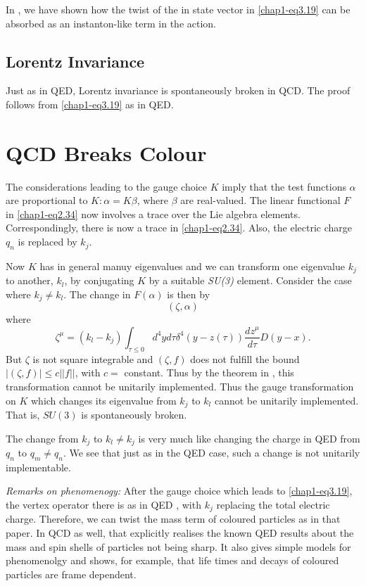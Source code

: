 In \cite{key4}, we have shown how the twist of the in state vector in \eqref{chap1-eq3.19} can be absorbed as an instanton-like term in the action.

\subsection{Lorentz Invariance}\label{chap1-sec3.2}

Just as in QED, Lorentz invariance is spontaneously broken in QCD. The proof follows from \eqref{chap1-eq3.19} as in QED.

\section{QCD Breaks Colour}\label{chap1-sec4}

The considerations leading to the gauge choice $K$ imply that the test functions $\alpha$ are proportional to $K: \alpha = K \beta$, where $\beta$ are real-valued. The linear functional $F$ in \eqref{chap1-eq2.34} now involves a trace over the Lie algebra elements. Correspondingly, there is now a trace in \eqref{chap1-eq2.34}. Also, the electric charge $q_n$ is replaced by $k_j$.

Now $K$ has in general manuy eigenvalues and we can transform one eigenvalue $k_j$ to another, $k_l$, by conjugating $K$ by a suitable \textit{SU(3)} element. Consider the case where $k_j \neq k_l$. The change in $F(\alpha)$ is then by
\begin{equation}
(\zeta, \alpha) \label{chap1-eq4.1}
\end{equation}
where
\begin{equation}
  \zeta^\mu = (k_l - k_j) \int_{\tau \leq 0} d^4 y d\tau \delta^4 (y -z(\tau)) \frac{dz^\mu}{d \tau} D (y-x). \label{chap1-eq4.2}
\end{equation}
But $\zeta$ is not square integrable and $(\zeta, f)$ does not fulfill the bound $|(\zeta, f)|\leq c || f ||$, with $c=$ constant. Thus by the theorem in \cite{key6}, this transformation cannot be unitarily implemented. Thus the gauge transformation on $K$ which changes its eigenvalue from $k_j$ to $k_l$ cannot be unitarily implemented. That is, $SU(3)$ is spontaneously broken.

The change from $k_j$ to $k_l \neq k_j$ is very much like changing the charge in QED from $q_n$ to $q_m \neq q_n$. We see that just as in the QED case, such a change is not unitarily implementable.

\textit{Remarks on phenomenogy:} After the gauge choice which leads to \eqref{chap1-eq3.19}, the vertex operator there is as in QED \cite{key4}, with $k_j$ replacing the total electric charge. Therefore, we can twist the mass term of coloured particles as in that paper. In QCD as well, that explicitly realises the known QED results \cite{key2, key3} about the mass and spin shells of particles not being sharp. It also gives simple models for phenomenolgy and shows, for example, that life times and decays of coloured particles are frame dependent.

